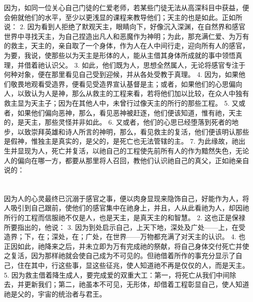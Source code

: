 因为，如同一位关心自己门徒的仁爱老师，若某些门徒无法从高深科目中获益，便会俯就他们的水平，至少以更浅显的课程来教导他们；天主的也是如此。正如所说： 2. 因为看到人拒绝了默观天主，眼睛向下，好像沉入深渊，在自然界和感官世界中寻找天主，为自己捏造出凡人和恶魔作为神明；为此，那充满仁爱、为万有的救主，天主的，亲自取了一个身体，作为人在人中间行走，迎向所有人的感官，为要，我说，使那些以为天主是形体的人，能从主借其身体所成就的事中领悟真理，并借着祂认识父。 3. 如此，他们既为人，思想全然属人，无论将感官专注于何种对象，便在那里看见自己受到迎候，并从各处受教于真理。 4. 因为，如果他们敬畏地观看受造界，便看见受造界宣认基督是主；或者，如果他们的心思偏向人，以致认为人是神，那么从救主的工程来看，若将他们加以比较，在众人中独有救主显为天主子；因为在其他人中，未曾行过像天主的所行的那些工程。 5. 又或者，如果他们偏向恶神，那么，看见恶神被赶逐，他们便该知道，惟有祂，天主的，是天主，那些灵怪并非如此。 6. 又或者，他们的心思已经堕落到死者的地步，以致崇拜英雄和诗人所言的神明，那么，看见救主的复活，他们便该明认那些是假神，惟独主是真实的，是父的，是死亡也无法管辖的主。 7. 为此缘故，祂出生并显现为人，死亡并复活，以祂自己的工程使先前所有人的作为黯然失色，无论人的偏向在哪一方，都要从那里将人召回，教他们认识祂自己的真父，正如祂亲自说的：\par


\section{}

因为人的心灵最终已沉溺于感官之事，便以肉身显现来隐饰自己，好能作为人，将人吸引到自己跟前，使他们的感官集中在祂身上，并且，人从此看祂为人，却因祂所行的工程而信服祂不仅是人，也是天主，是真天主的和智慧。 2. 这也正是保禄所要指出的，他说： 3. 因为到处启示自己，上天下地，深处及广处——上，在受造界；下，在；深处，在；广处，在世界——万物都充满了对天主的认识。 4. 也正因如此，祂降来之后，并未立即为万有完成祂的祭献，将自己身体交付死亡并使之复活，因为那样祂就会使自己成为不可见的。但祂借着所作的事充分显示了自己，住在其中，行这些事，显这些征兆，使人知道祂不再是仅仅的人，而是天主。 5. 因为救主借着降生成人，要完成爱的双重大工：第一，将死亡从我们中间除去，并更新我们；第二，祂虽本不可见，无形体，却借着工程彰显自己，使人知道祂是父的，宇宙的统治者与君王。\par

